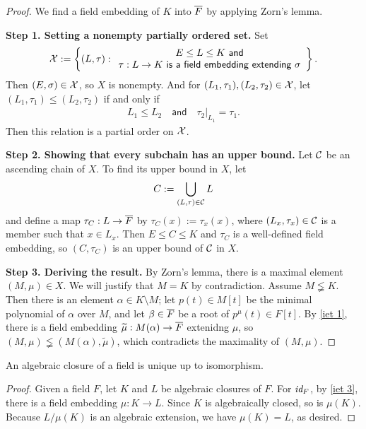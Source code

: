 \begin{proof}
    We find a field embedding of $K$ into $\overline{F}$ by applying Zorn's lemma.

    \textbf{Step 1. Setting a nonempty partially ordered set.}\newline\noindent
    Set
    \begin{align*}
        {\mathcal{X}}:=\left\{(L, \tau):
        \begin{array}{c}
            E\leq L\leq K\textsf{ and}\\
            \tau: L\rightarrow K\textsf{ is a field embedding extending }\sigma
        \end{array}
        \right\}.
    \end{align*}
    Then $(E, \sigma)\in {\mathcal{X}}$, so $X$ is nonempty.
    And for $(L_1, \tau_1), (L_2, \tau_2)\in {\mathcal{X}}$, let $(L_1, \tau_1)\leq(L_2, \tau_2)$ if and only if
    \begin{align*}
        L_1\leq L_2\quad\textsf{and}\quad\tau_2|_{L_1}=\tau_1.
    \end{align*}
    \color{brown}Then this relation is a partial order on ${\mathcal{X}}$.\color{black}

    \textbf{Step 2. Showing that every subchain has an upper bound.}\newline\noindent
    Let ${\mathcal{C}}$ be an ascending chain of $X$.
    To find its upper bound in $X$, let
    \begin{align*}
        C:=\bigcup_{(L, \tau)\in {\mathcal{C}}} L
    \end{align*}
    and define a map $\tau_C: L\rightarrow \overline{F}$ by $\tau_C(x):=\tau_x(x)$, where $(L_x, \tau_x)\in{\mathcal{C}}$ is a member such that $x\in L_x$.
    \color{brown}Then $E\leq C\leq K$ and $\tau_C$ is a well-defined field embedding, \color{black}so $(C, \tau_C)$ is an upper bound of ${\mathcal{C}}$ in $X$.

    \textbf{Step 3. Deriving the result.}\newline\noindent
    By Zorn's lemma, there is a maximal element $(M, \mu)\in X$.
    We will justify that $M=K$ by contradiction.
    Assume $M\lneqq K$.
    Then there is an element $\alpha\in K\setminus M$; let $p(t)\in M[t]$ be the minimal polynomial of $\alpha$ over $M$, and let $\beta\in \overline{F}$ be a root of $p^\mu(t)\in F[t]$.
    By \cref{iet 1}, there is a field embedding $\widetilde{\mu}: M(\alpha)\rightarrow\overline{F}$ extenidng $\mu$, so $(M, \mu)\lneqq(M(\alpha), \widetilde{\mu})$, which contradicts the maximality of $(M, \mu)$.
\end{proof}
\begin{cor}
    An algebraic closure of a field is unique up to isomorphism.
\end{cor}
\begin{proof}
    Given a field $F$, let $K$ and $L$ be algebraic closures of $F$.
    For $\textit{id}_{F}$, by \cref{iet 3}, there is a field embedding $\mu: K\rightarrow L$.
    Since $K$ is algebraically closed, so is $\mu(K)$.
    Because $L/\mu(K)$ is an algebraic extension, we have $\mu(K)=L$, as desired.
\end{proof}